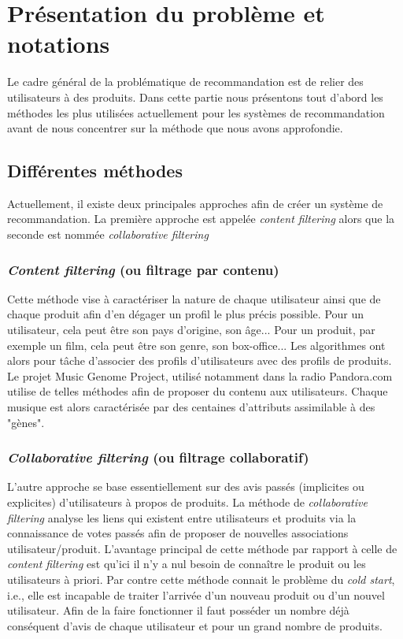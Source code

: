 \documentclass[10pt,a4paper]{article}
\begin{document}
\section{Présentation du problème et notations}

Le cadre général de la problématique de recommandation est de relier des utilisateurs à des produits. Dans cette partie nous présentons tout d'abord les méthodes les plus utilisées actuellement pour les systèmes de recommandation avant de nous concentrer sur la méthode que nous avons approfondie.

\subsection{Différentes méthodes}

Actuellement, il existe deux principales approches afin de  créer un système de recommandation. La première approche est appelée \textit{content filtering} alors que la seconde est nommée \textit{collaborative filtering}

\subsubsection*{\textit{Content filtering} (ou filtrage par contenu)}

Cette méthode vise à caractériser la nature de chaque utilisateur ainsi que de chaque produit afin d'en dégager un profil le plus précis possible. Pour un utilisateur, cela peut être son pays d'origine, son âge... Pour un produit, par exemple un film, cela peut être son genre, son box-office... Les algorithmes ont alors pour tâche d'associer des profils d'utilisateurs avec des profils de produits. Le projet Music Genome Project, utilisé notamment dans la radio Pandora.com utilise de telles méthodes afin de proposer du contenu aux utilisateurs. Chaque musique est alors caractérisée par des centaines d'attributs assimilable à des "gènes". 


\subsubsection*{\textit{Collaborative filtering} (ou filtrage collaboratif)}

L'autre approche se base essentiellement sur des avis passés (implicites ou explicites) d'utilisateurs à propos de produits. La méthode de \textit{collaborative filtering} analyse les liens qui existent entre utilisateurs et produits via la connaissance de votes passés afin de proposer de nouvelles associations utilisateur/produit. L'avantage principal de cette méthode par rapport à celle de \textit{content filtering} est qu'ici il n'y a nul besoin de connaître le produit ou les utilisateurs à priori. Par contre cette méthode connait le problème du \textit{cold start}, i.e., elle est incapable de traiter l'arrivée d'un nouveau produit ou d'un nouvel utilisateur. Afin de la faire fonctionner il faut posséder un nombre déjà conséquent d'avis de chaque utilisateur et pour un grand nombre de produits.
\end{document}
